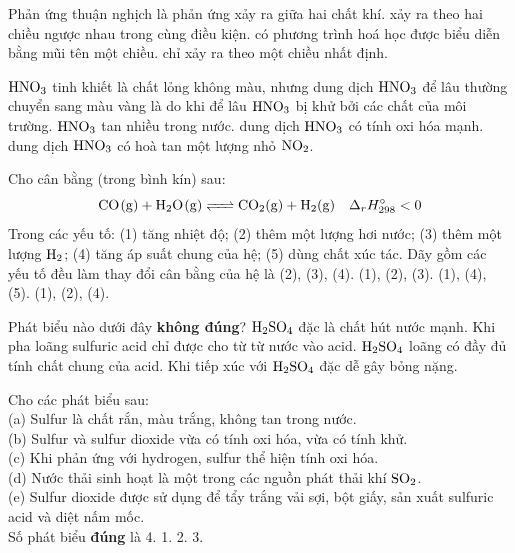 \documentclass[12pt,a4paper]{article}
\begin{document}
\begin{ex}
Phản ứng thuận nghịch là phản ứng
\choice
{xảy ra giữa hai chất khí.}
{xảy ra theo hai chiều ngược nhau trong cùng điều kiện.}
{có phương trình hoá học được biểu diễn bằng mũi tên một chiều.}
{chỉ xảy ra theo một chiều nhất định.}
\loigiai{}
\end{ex}

\begin{ex}
$\ce{HNO3}$ tinh khiết là chất lỏng không màu, nhưng dung dịch $\ce{HNO3}$ để lâu thường chuyển sang màu vàng là do
\choice
{khi để lâu $\ce{HNO3}$ bị khử bởi các chất của môi trường.}
{$\ce{HNO3}$ tan nhiều trong nước.}
{dung dịch $\ce{HNO3}$ có tính oxi hóa mạnh.}
{dung dịch $\ce{HNO3}$ có hoà tan một lượng nhỏ $\ce{NO2}$.}
\loigiai{}
\end{ex}

\begin{ex}
Cho cân bằng (trong bình kín) sau:
\[ \ce{CO(g) + H2O(g) <=> CO2(g) + H2(g)} \quad \Delta_r H_{298}^\circ < 0 \]
Trong các yếu tố: (1) tăng nhiệt độ; (2) thêm một lượng hơi nước; (3) thêm một lượng $\ce{H2}$; (4) tăng áp suất chung của hệ; (5) dùng chất xúc tác. Dãy gồm các yếu tố đều làm thay đổi cân bằng của hệ là
\choice
{(2), (3), (4).}
{(1), (2), (3).}
{(1), (4), (5).}
{(1), (2), (4).}
\loigiai{}
\end{ex}

\begin{ex}
Phát biểu nào dưới đây \textbf{không đúng}?
\choice
{$\ce{H2SO4}$ đặc là chất hút nước mạnh.}
{Khi pha loãng sulfuric acid chỉ được cho từ từ nước vào acid.}
{$\ce{H2SO4}$ loãng có đầy đủ tính chất chung của acid.}
{Khi tiếp xúc với $\ce{H2SO4}$ đặc dễ gây bỏng nặng.}
\loigiai{}
\end{ex}

\begin{ex}
Cho các phát biểu sau:\\
(a) Sulfur là chất rắn, màu trắng, không tan trong nước.\\
(b) Sulfur và sulfur dioxide vừa có tính oxi hóa, vừa có tính khử.\\
(c) Khi phản ứng với hydrogen, sulfur thể hiện tính oxi hóa.\\
(d) Nước thải sinh hoạt là một trong các nguồn phát thải khí $\ce{SO2}$.\\
(e) Sulfur dioxide được sử dụng để tẩy trắng vải sợi, bột giấy, sản xuất sulfuric acid và diệt nấm mốc.\\
Số phát biểu \textbf{đúng} là
\choice
{4.}
{1.}
{2.}
{3.}
\loigiai{}
\end{ex}
\end{document}
